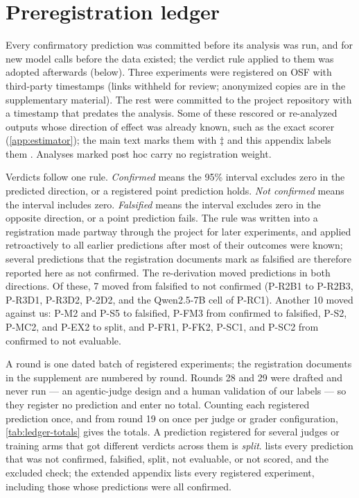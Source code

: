 \FloatBarrier
\section{Preregistration ledger}
\label{app:ledger}

Every confirmatory prediction was committed before its analysis was run, and for new model calls before the data existed; the verdict rule applied to them was adopted afterwards (below). Three experiments were registered on OSF with third-party timestamps\osf{} (links withheld for review; anonymized copies are in the supplementary material). The rest were committed to the project repository with a timestamp that predates the analysis\pre. Some of these rescored or re-analyzed outputs whose direction of effect was already known, such as the exact scorer (\cref{app:estimator}); the main text marks them with $\ddagger$ and this appendix labels them \pre. Analyses marked post hoc\ph{} carry no registration weight.

Verdicts follow one rule. \emph{Confirmed} means the 95\% interval excludes zero in the predicted direction, or a registered point prediction holds. \emph{Not confirmed} means the interval includes zero. \emph{Falsified} means the interval excludes zero in the opposite direction, or a point prediction fails. The rule was written into a registration made partway through the project for later experiments, and applied retroactively to all earlier predictions after most of their outcomes were known; several predictions that the registration documents mark as falsified are therefore reported here as not confirmed. The re-derivation moved predictions in both directions. Of these, 7 moved from falsified to not confirmed (P-R2B1 to P-R2B3, P-R3D1, P-R3D2, P-2D2, and the Qwen2.5-7B cell of P-RC1). Another 10 moved against us: P-M2 and P-S5 to falsified, P-FM3 from confirmed to falsified, P-S2, P-MC2, and P-EX2 to split, and P-FR1, P-FK2, P-SC1, and P-SC2 from confirmed to not evaluable.

A round is one dated batch of registered experiments; the registration documents in the supplement are numbered by round. Rounds 28 and 29 were drafted and never run --- an agentic-judge design and a human validation of our labels --- so they register no prediction and enter no total. Counting each registered prediction once, and from round 19 on once per judge or grader configuration, \cref{tab:ledger-totals} gives the totals. A prediction registered for several judges or training arms that got different verdicts across them is \emph{split}.  lists every prediction that was not confirmed, falsified, split, not evaluable, or not scored, and the excluded check; the extended appendix lists every registered experiment, including those whose predictions were all confirmed.

